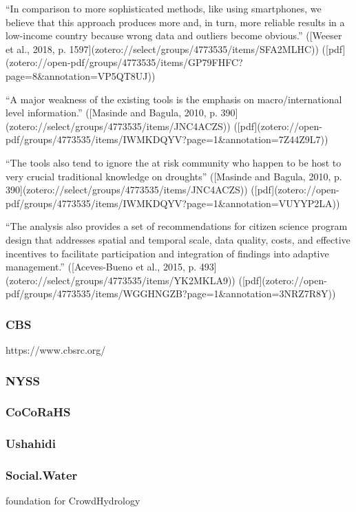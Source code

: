 {“In comparison to more sophisticated methods, like using smartphones, we believe that this approach produces more and, in turn, more reliable results in a low-income country because wrong data and outliers become obvious.” ([Weeser et al., 2018, p. 1597](zotero://select/groups/4773535/items/SFA2MLHC)) ([pdf](zotero://open-pdf/groups/4773535/items/GP79FHFC?page=8&annotation=VP5QT8UJ))

“A major weakness of the existing tools is the emphasis on macro/international level information.” ([Masinde and Bagula, 2010, p. 390](zotero://select/groups/4773535/items/JNC4ACZS)) ([pdf](zotero://open-pdf/groups/4773535/items/IWMKDQYV?page=1&annotation=7Z44Z9L7))

“The tools also tend to ignore the at risk community who happen to be host to very crucial traditional knowledge on droughts” ([Masinde and Bagula, 2010, p. 390](zotero://select/groups/4773535/items/JNC4ACZS)) ([pdf](zotero://open-pdf/groups/4773535/items/IWMKDQYV?page=1&annotation=VUYYP2LA))

“The analysis also provides a set of recommendations for citizen science program design that addresses spatial and temporal scale, data quality, costs, and effective incentives to facilitate participation and integration of findings into adaptive management.” ([Aceves-Bueno et al., 2015, p. 493](zotero://select/groups/4773535/items/YK2MKLA9)) ([pdf](zotero://open-pdf/groups/4773535/items/WGGHNGZB?page=1&annotation=3NRZ7R8Y))

\subsubsection{CBS}
https://www.cbsrc.org/

\subsubsection{NYSS}

\subsubsection{CoCoRaHS}

\subsubsection{Ushahidi} %

\subsubsection{Social.Water}
foundation for CrowdHydrology
}
